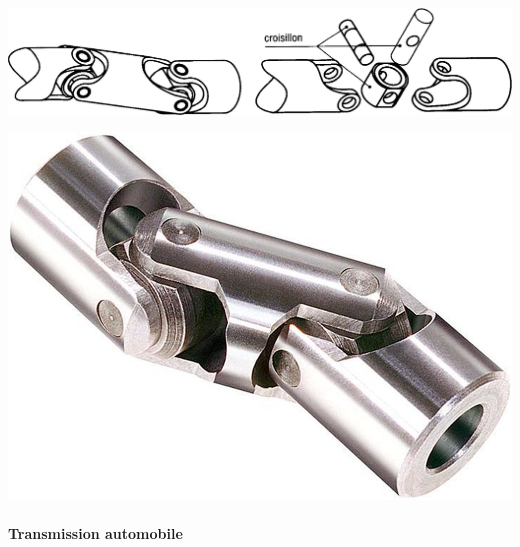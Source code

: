\documentclass[11pt,oneside]{article}
\begin{document}
\begin{minipage}[c]{.6\linewidth}
\begin{center}
\includegraphics[width=.9\textwidth]{png/fig_36}
\end{center}
\end{minipage} \hfill
\begin{minipage}[c]{.3\linewidth}
\begin{center}
\includegraphics[width=.9\textwidth]{png/fig_36_b}
\end{center}
\end{minipage} 


\paragraph{Transmission automobile}
\end{document}
